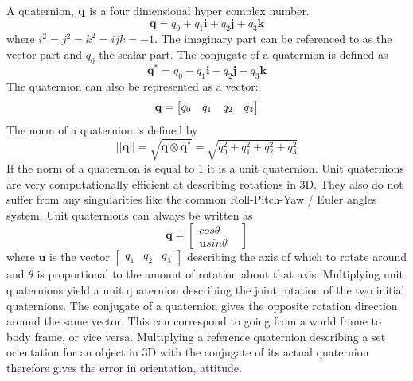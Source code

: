 \documentclass{article}
\begin{document}
A quaternion, $\bold{q}$ is a four dimensional hyper complex number.\cite{P2}
\begin{equation}
 \mathbf{q} = q_0 + q_1 \mathbf{i} + q_2 \mathbf{j} + q_3 \mathbf{k}
\end{equation}
where $i^2 = j^2 = k^2 = ijk = -1$.\cite{Sola2016}
The imaginary part can be referenced to as the vector part and $q_0$ the scalar part.
The conjugate of a quaternion is defined as
\begin{equation}
     \mathbf{q^*} = q_0 - q_1 \mathbf{i} - q_2 \mathbf{j} - q_3 \mathbf{k}
\end{equation}
The quaternion can also be represented as a vector:
\begin{equation}
     \bold{q} = \left[
     \begin{matrix}
     q_0 &q_1 &q_2 &q_3
     \end{matrix}\right]
\end{equation}
The norm of a quaternion is defined by
\begin{equation}
    ||\mathbf{q}|| = \sqrt{\mathbf{q} \otimes \mathbf{q}^*} = \sqrt{q_0^2 + q_1^2 + q_2^2 + q_3^2}
\end{equation}
If the norm of a quaternion is equal to $1$ it is a unit quaternion.
Unit quaternions are very computationally efficient at describing rotations in 3D.
They also do not suffer from any singularities like the common Roll-Pitch-Yaw / Euler angles system.
Unit quaternions can always be written as
\begin{equation}
    \mathbf{q} = \left[\begin{matrix} cos \theta &\\ \mathbf{u} sin \theta\end{matrix}\right]
\end{equation}
where $\mathbf{u}$ is the vector $\left[\begin{matrix} q_1 & q_2 & q_3 \end{matrix}\right]$
describing the axis of which to rotate around and $\theta$ is proportional to the amount of rotation about that axis.
Multiplying unit quaternions yield a unit quaternion describing the joint rotation of the two initial quaternions.
The conjugate of a quaternion gives the opposite rotation direction around the same vector.
This can correspond to going from a world frame to body frame, or vice versa.
Multiplying a reference quaternion describing a set orientation for an object in 3D with the conjugate of its actual quaternion therefore gives the error in orientation, attitude.
\end{document}

